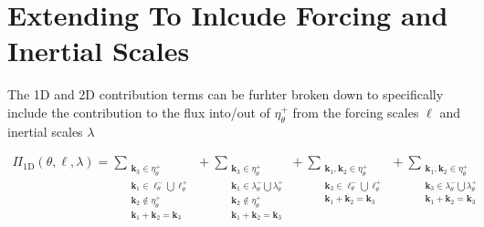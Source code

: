 \documentclass[9pt]{article}
\newcommand{\bfkn}[1]{\mathbf{k}_{#1}}								%
\begin{document}
\section{Extending To Inlcude Forcing and Inertial Scales}

The 1D and 2D contribution terms can be furhter broken down to specifically include the contribution to the flux into/out of $\eta_{\theta}^{+}$ from the forcing scales $\ell$ and inertial scales $\lambda$

\begin{align}
  \Pi_{\text{1D}}(\theta, \ell, \lambda) = \sum_{\substack{\bfkn{3} \in \eta_{\theta}^{+} \\ \bfkn{1} \in \ell_{\theta}^{-} \bigcup \ell_{\theta}^{+} \\ \bfkn{2} \notin \eta_{\theta}^{+} \\ \bfkn{1} + \bfkn{2} = \bfkn{3}}} +  \sum_{\substack{\bfkn{3} \in \eta_{\theta}^{+} \\ \bfkn{1} \in \lambda_{\theta}^{-} \bigcup \lambda_{\theta}^{+} \\ \bfkn{2} \notin \eta_{\theta}^{+} \\ \bfkn{1} + \bfkn{2} = \bfkn{3}}} + \sum_{\substack{\bfkn{1}, \bfkn{2} \in \eta_{\theta}^{+} \\ \bfkn{3} \in \ell_{\theta}^{-} \bigcup \ell_{\theta}^{+} \\ \bfkn{1} + \bfkn{2} = \bfkn{3}}} + \sum_{\substack{\bfkn{1}, \bfkn{2} \in \eta_{\theta}^{+} \\ \bfkn{3} \in \lambda_{\theta}^{-} \bigcup \lambda_{\theta}^{+} \\ \bfkn{1} + \bfkn{2} = \bfkn{3}}}
\end{align}
\end{document}
